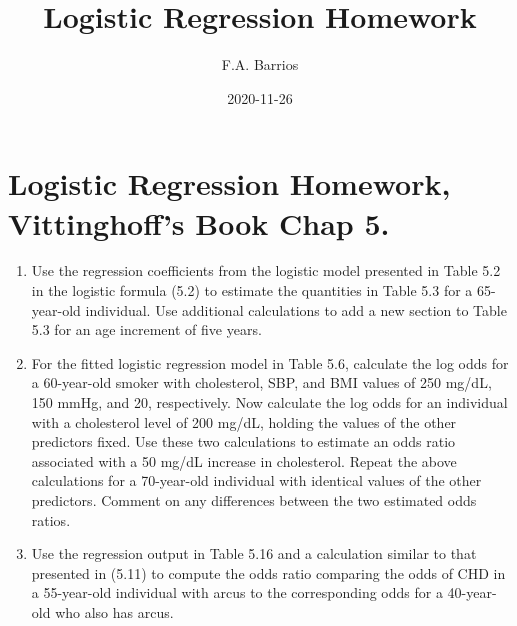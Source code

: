 \documentclass[
]{article}
\title{Logistic Regression Homework}
\author{F.A. Barrios}
\date{2020-11-26}
\begin{document}
\maketitle

\hypertarget{logistic-regression-homework-vittinghoffs-book-chap-5.}{%
\section{Logistic Regression Homework, Vittinghoff's Book Chap
5.}\label{logistic-regression-homework-vittinghoffs-book-chap-5.}}

\begin{enumerate}
\def\labelenumi{\arabic{enumi}.}
\item
  Use the regression coefficients from the logistic model presented in
  Table 5.2 in the logistic formula (5.2) to estimate the quantities in
  Table 5.3 for a 65-year-old individual. Use additional calculations to
  add a new section to Table 5.3 for an age increment of five years.
\item
  For the fitted logistic regression model in Table 5.6, calculate the
  log odds for a 60-year-old smoker with cholesterol, SBP, and BMI
  values of 250 mg/dL, 150 mmHg, and 20, respectively. Now calculate the
  log odds for an individual with a cholesterol level of 200 mg/dL,
  holding the values of the other predictors fixed. Use these two
  calculations to estimate an odds ratio associated with a 50 mg/dL
  increase in cholesterol. Repeat the above calculations for a
  70-year-old individual with identical values of the other predictors.
  Comment on any differences between the two estimated odds ratios.
\item
  Use the regression output in Table 5.16 and a calculation similar to
  that presented in (5.11) to compute the odds ratio comparing the odds
  of CHD in a 55-year-old individual with arcus to the corresponding
  odds for a 40-year-old who also has arcus.
\end{enumerate}
\end{document}
